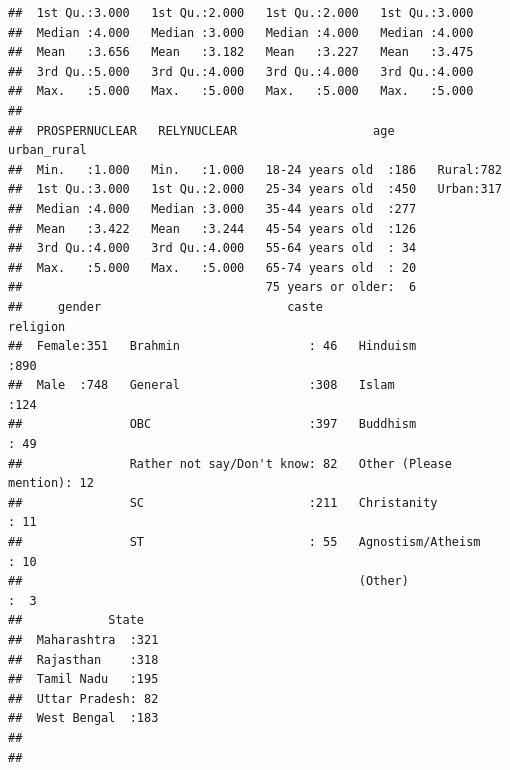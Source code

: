 \documentclass[
]{article}
\begin{document}
\begin{verbatim}
##  1st Qu.:3.000   1st Qu.:2.000   1st Qu.:2.000   1st Qu.:3.000  
##  Median :4.000   Median :3.000   Median :4.000   Median :4.000  
##  Mean   :3.656   Mean   :3.182   Mean   :3.227   Mean   :3.475  
##  3rd Qu.:5.000   3rd Qu.:4.000   3rd Qu.:4.000   3rd Qu.:4.000  
##  Max.   :5.000   Max.   :5.000   Max.   :5.000   Max.   :5.000  
##                                                                 
##  PROSPERNUCLEAR   RELYNUCLEAR                   age      urban_rural
##  Min.   :1.000   Min.   :1.000   18-24 years old  :186   Rural:782  
##  1st Qu.:3.000   1st Qu.:2.000   25-34 years old  :450   Urban:317  
##  Median :4.000   Median :3.000   35-44 years old  :277              
##  Mean   :3.422   Mean   :3.244   45-54 years old  :126              
##  3rd Qu.:4.000   3rd Qu.:4.000   55-64 years old  : 34              
##  Max.   :5.000   Max.   :5.000   65-74 years old  : 20              
##                                  75 years or older:  6              
##     gender                          caste                       religion  
##  Female:351   Brahmin                  : 46   Hinduism              :890  
##  Male  :748   General                  :308   Islam                 :124  
##               OBC                      :397   Buddhism              : 49  
##               Rather not say/Don't know: 82   Other (Please mention): 12  
##               SC                       :211   Christanity           : 11  
##               ST                       : 55   Agnostism/Atheism     : 10  
##                                               (Other)               :  3  
##            State    
##  Maharashtra  :321  
##  Rajasthan    :318  
##  Tamil Nadu   :195  
##  Uttar Pradesh: 82  
##  West Bengal  :183  
##                     
## 
\end{verbatim}
\end{document}
